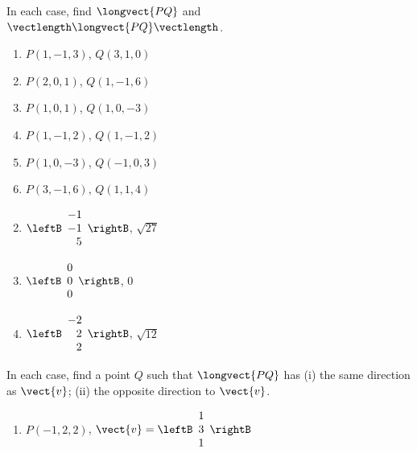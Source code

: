 \begin{multicols}{2}
\begin{ex}
In each case, find $\longvect{PQ}$ and $\vectlength \longvect{PQ} \vectlength$.

\begin{enumerate}[label={\alph*.}]
\item $P(1, -1, 3)$, $Q(3, 1, 0)$

\item $P(2, 0, 1)$, $Q(1, -1, 6)$

\item $P(1, 0, 1)$, $Q(1, 0, -3)$

\item $P(1, -1, 2)$, $Q(1, -1, 2)$

\item $P(1, 0, -3)$, $Q(-1, 0, 3)$

\item $P(3, -1, 6)$, $Q(1, 1, 4)$

\end{enumerate}
\begin{sol}
\begin{enumerate}[label={\alph*.}]
\setcounter{enumi}{1}
\item 
$\leftB
\begin{array}{r}
-1\\
-1\\
5
\end{array}
\rightB$, 
$\sqrt{27}$

\setcounter{enumi}{3}
\item 
$\leftB
\begin{array}{r}
0\\
0\\
0
\end{array}
\rightB$,
$0$

\setcounter{enumi}{5}
\item 
$\leftB
\begin{array}{r}
-2\\
2\\
2
\end{array}
\rightB$, 
$\sqrt{12}$


\end{enumerate}
\end{sol}
\end{ex}

\begin{ex}
In each case, find a point $Q$ such that $\longvect{PQ}$ has (i) the same direction as $\vect{v}$; (ii) the opposite direction to $\vect{v}$.


\begin{enumerate}[label={\alph*.}]
\item
$P(-1,2,2)$, $\vect{v} = \leftB
\begin{array}{r}
1\\
3\\
1
\end{array}
\rightB$


\end{enumerate}
\end{ex}
\end{multicols}
